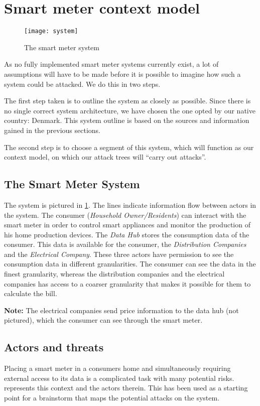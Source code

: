 \section{Smart meter context model}

\begin{figure}[h]
  \texttt{[image: system]}
  \caption{The smart meter system\cite{tdlm}}
  \label{contextual:system}
\end{figure}

As no fully implemented smart meter systems currently exist, a lot of assumptions will have to be made before it is possible to imagine how such a system could be attacked.
We do this in two steps.

The first step taken is to outline the system as closely as possible.
Since there is no single correct system architecture, we have chosen the one opted by our native country: Denmark.
This system outline is based on the sources and information gained in the previous sections.

The second step is to choose a segment of this system, which will function as our context model, on which our attack trees will ``carry out attacks''.
\subsection{The Smart Meter System}
The system is pictured in \cref{contextual:system}.
The lines indicate information flow between actors in the system.
The consumer (\textit{Household Owner/Residents}) can interact with the smart meter in order to control smart appliances and monitor the production of his home production devices.
The \textit{Data Hub} stores the consumption data of the consumer.
This data is available for the consumer, the \textit{Distribution Companies} and the \textit{Electrical Company}.
These three actors have permission to see the consumption data in different granularities.
The consumer can see the data in the finest granularity, whereas the distribution companies and the electrical companies has access to a coarser granularity that makes it possible for them to calculate the bill.

\textbf{Note:} The electrical companies send price information to the data hub (not pictured), which the consumer can see through the smart meter.

\subsection{Actors and threats}
Placing a smart meter in a consumers home and simultaneously requiring external access to its data is a complicated task with many potential risks.
 represents this context and the actors therein.
This has been used as a starting point for a brainstorm that maps the potential attacks on the system.


